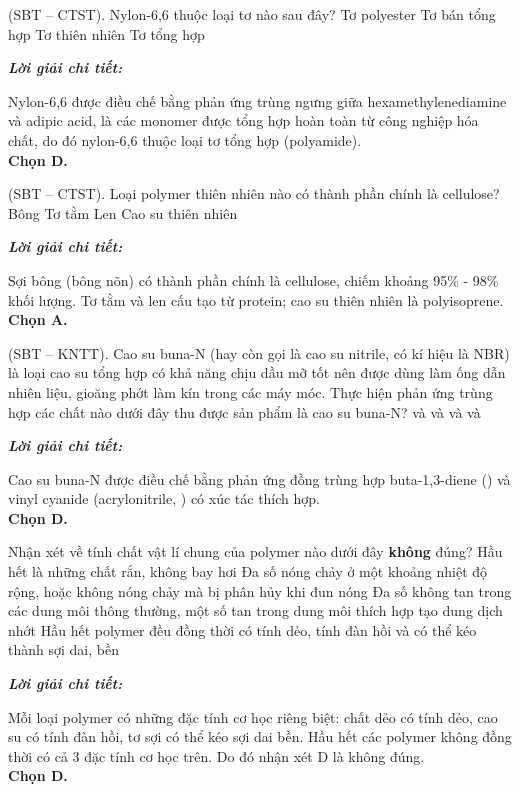 \documentclass[11pt,a4paper]{article}
\def\loigiai#1{
\par\begingroup\color{blue!80!black}\small
\noindent\textbf{\textit{Lời giải chi tiết:}}\par
#1\par\endgroup}
\begin{document}
\begin{ex}
(SBT -- CTST). Nylon-6,6 thuộc loại tơ nào sau đây?
\choice
{Tơ polyester}
{Tơ bán tổng hợp}
{Tơ thiên nhiên}
{\True Tơ tổng hợp}
\loigiai{
Nylon-6,6 được điều chế bằng phản ứng trùng ngưng giữa hexamethylenediamine và adipic acid, là các monomer được tổng hợp hoàn toàn từ công nghiệp hóa chất, do đó nylon-6,6 thuộc loại tơ tổng hợp (polyamide).\\
\textbf{Chọn D.}}
\end{ex}

\begin{ex}
(SBT -- CTST). Loại polymer thiên nhiên nào có thành phần chính là cellulose?
\choice
{\True Bông}
{Tơ tằm}
{Len}
{Cao su thiên nhiên}
\loigiai{
Sợi bông (bông nõn) có thành phần chính là cellulose, chiếm khoảng 95\% - 98\% khối lượng. Tơ tằm và len cấu tạo từ protein; cao su thiên nhiên là polyisoprene.\\
\textbf{Chọn A.}}
\end{ex}

\begin{ex}
(SBT -- KNTT). Cao su buna-N (hay còn gọi là cao su nitrile, có kí hiệu là NBR) là loại cao su tổng hợp có khả năng chịu dầu mỡ tốt nên được dùng làm ống dẫn nhiên liệu, gioăng phớt làm kín trong các máy móc. Thực hiện phản ứng trùng hợp các chất nào dưới đây thu được sản phẩm là cao su buna-N?
\choice
{ và }
{ và }
{ và }
{\True {} và }
\loigiai{
Cao su buna-N được điều chế bằng phản ứng đồng trùng hợp buta-1,3-diene (\ce{CH2=CH-CH=CH2}) và vinyl cyanide (acrylonitrile, \ce{CH2=CH-CN}) có xúc tác thích hợp.\\
\textbf{Chọn D.}}
\end{ex}

\begin{ex}
Nhận xét về tính chất vật lí chung của polymer nào dưới đây \textbf{không} đúng?
\choice
{Hầu hết là những chất rắn, không bay hơi}
{Đa số nóng chảy ở một khoảng nhiệt độ rộng, hoặc không nóng chảy mà bị phân hủy khi đun nóng}
{Đa số không tan trong các dung môi thông thường, một số tan trong dung môi thích hợp tạo dung dịch nhớt}
{\True Hầu hết polymer đều đồng thời có tính dẻo, tính đàn hồi và có thể kéo thành sợi dai, bền}
\loigiai{
Mỗi loại polymer có những đặc tính cơ học riêng biệt: chất dẻo có tính dẻo, cao su có tính đàn hồi, tơ sợi có thể kéo sợi dai bền. Hầu hết các polymer không đồng thời có cả 3 đặc tính cơ học trên. Do đó nhận xét D là không đúng.\\
\textbf{Chọn D.}}
\end{ex}
\end{document}
